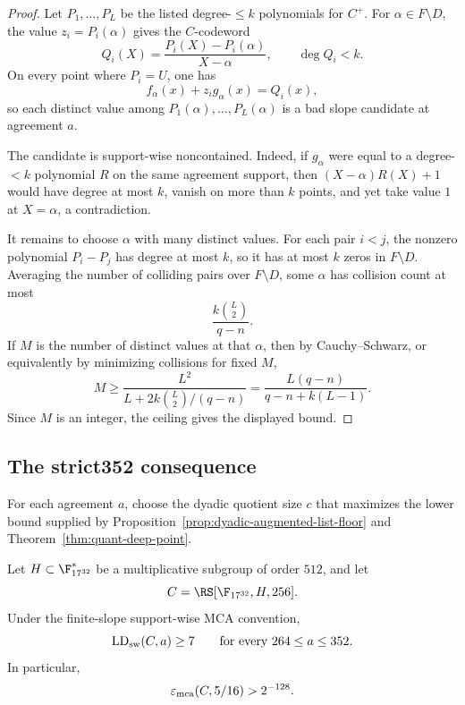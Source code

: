 \begin{proof}
Let \(P_1,\ldots,P_L\) be the listed degree-\(\le k\) polynomials for \(C^+\).
For \(\alpha\in F\setminus D\), the value \(z_i=P_i(\alpha)\) gives the
\(C\)-codeword
\[
  Q_i(X)=\frac{P_i(X)-P_i(\alpha)}{X-\alpha},
  \qquad \deg Q_i<k.
\]
On every point where \(P_i=U\), one has
\[
  f_\alpha(x)+z_ig_\alpha(x)=Q_i(x),
\]
so each distinct value among \(P_1(\alpha),\ldots,P_L(\alpha)\) is a bad slope
candidate at agreement \(a\).

The candidate is support-wise noncontained.  Indeed, if \(g_\alpha\) were equal
to a degree-\(<k\) polynomial \(R\) on the same agreement support, then
\((X-\alpha)R(X)+1\) would have degree at most \(k\), vanish on more than \(k\)
points, and yet take value \(1\) at \(X=\alpha\), a contradiction.

It remains to choose \(\alpha\) with many distinct values.  For each pair
\(i<j\), the nonzero polynomial \(P_i-P_j\) has degree at most \(k\), so it has
at most \(k\) zeros in \(F\setminus D\).  Averaging the number of colliding
pairs over \(F\setminus D\), some \(\alpha\) has collision count at most
\[
  \frac{k\binom{L}{2}}{q-n}.
\]
If \(M\) is the number of distinct values at that \(\alpha\), then by
Cauchy--Schwarz, or equivalently by minimizing collisions for fixed \(M\),
\[
  M\ge \frac{L^2}{L+2k\binom{L}{2}/(q-n)}
   =\frac{L(q-n)}{q-n+k(L-1)}.
\]
Since \(M\) is an integer, the ceiling gives the displayed bound.
\end{proof}

\subsection{The strict352 consequence}

For each agreement \(a\), choose the dyadic quotient size \(c\) that maximizes
the lower bound supplied by Proposition~\ref{prop:dyadic-augmented-list-floor}
and Theorem~\ref{thm:quant-deep-point}.

\begin{theorem}
\label{thm:strict352-quotient-core}
Let \(H\subset\F_{17^{32}}^*\) be a multiplicative subgroup of order \(512\), and
let
\[
  C=\RS[\F_{17^{32}},H,256].
\]
Under the finite-slope support-wise MCA convention,
\[
  \operatorname{LD}_{\rm sw}(C,a)\ge7
  \qquad\text{for every }264\le a\le352.
\]
In particular,
\[
  \varepsilon_{\rm mca}(C,5/16)>2^{-128}.
\]
\end{theorem}

